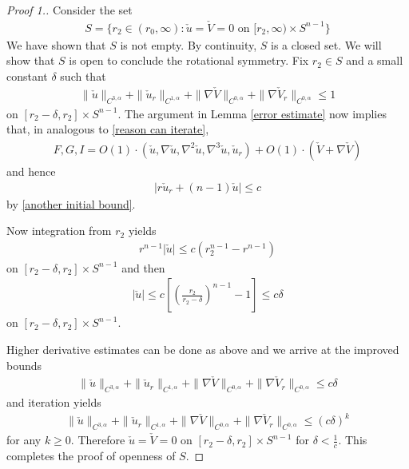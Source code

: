 \documentclass[12pt,twoside]{article}
\theoremstyle{plain}
\theoremstyle{definition}
\theoremstyle{remark}
\newcommand{\na}{\nabla}
\newcommand{\lt}{\left}
\newcommand{\rt}{\right}
\newcommand{\cu}{\check{u}}
\newcommand{\cV}{\check{V}}
\numberwithin{equation}{section}
\begin{document}
\begin{proof}[Proof 1.]
Consider the set 
\begin{align*}
S = \{ r_2 \in (r_0,\infty) : \cu = \cV =0 \mbox{ on } [r_2,\infty) \times S^{n-1} \}
\end{align*} 
We have shown that $S$ is not empty. By continuity, $S$ is a closed set. We will show that $S$ is open to conclude the rotational symmetry. Fix $r_2 \in S$ and a small constant $\delta$ such that 
\begin{align}\label{another initial bound}
\| \cu\|_{C^{3,\alpha}} + \| \cu_r \|_{C^{1,\alpha}} + \| \na\cV \|_{C^{0,\alpha}} + \| \na \cV_r\|_{C^{0,\alpha}} \le 1
\end{align}
on $[ r_2 - \delta, r_2] \times S^{n-1}$. The argument in Lemma \ref{error estimate} now implies that, in analogous to \eqref{reason can iterate},
\begin{align*}
F,G,I = O(1) \cdot \lt( \cu, \na\cu, \na^2\cu, \na^3\cu, \cu_r \rt) +  O(1) \cdot \lt( \cV + \na\cV \rt)
\end{align*}
and hence
\begin{align*}
\lt| r \cu_r + (n-1)\cu \rt| \le c
\end{align*}
by \eqref{another initial bound}.

Now integration from $r_2$ yields
\begin{align*}
r^{n-1} |\cu|   \le c \lt( r_2^{n-1} - r^{n-1} \rt)
\end{align*}
on $[r_2 - \delta, r_2] \times S^{n-1}$
and then
\begin{align*}
|\cu| \le c \lt[ \lt( \frac{r_2}{r_2 - \delta}\rt)^{n-1} -1 \rt] \le c\delta
\end{align*}
on $[r_2 - \delta, r_2] \times S^{n-1}$.

Higher derivative estimates can be done as above and we arrive at the improved bounds
\begin{align*}
\| \cu\|_{C^{3,\alpha}} + \| \cu_r \|_{C^{1,\alpha}} + \| \na\cV \|_{C^{0,\alpha}} + \| \na \cV_r\|_{C^{0,\alpha}} \le c\delta
\end{align*}
and iteration yields
\begin{align*}
\| \cu\|_{C^{3,\alpha}} + \| \cu_r \|_{C^{1,\alpha}} + \| \na\cV \|_{C^{0,\alpha}} + \| \na \cV_r\|_{C^{0,\alpha}} \le ( c\delta )^k
\end{align*}
for any $k \ge 0$. Therefore $\cu = \cV =0$ on $[r_2 - \delta, r_2] \times S^{n-1}$ for $\delta < \frac{1}{c}$. This completes the proof of openness of $S$.
\end{proof}  
\end{document}
